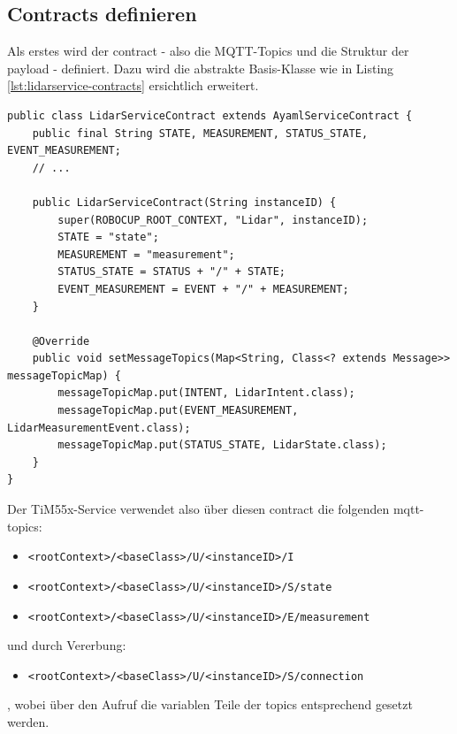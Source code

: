 \subsection{Contracts definieren}
Als erstes wird der \Gls{contract} - also die MQTT-Topics und die Struktur der \Gls{payload} - definiert. Dazu wird die abstrakte Basis-Klasse  wie in Listing \ref{lst:lidarservice-contracts} ersichtlich erweitert.
\begin{lstlisting}[caption={TiM55x-Service - Contracts},label={lst:lidarservice-contracts}]
public class LidarServiceContract extends AyamlServiceContract {
    public final String STATE, MEASUREMENT, STATUS_STATE, EVENT_MEASUREMENT;
    // ...

    public LidarServiceContract(String instanceID) {
        super(ROBOCUP_ROOT_CONTEXT, "Lidar", instanceID);
        STATE = "state";
        MEASUREMENT = "measurement";
        STATUS_STATE = STATUS + "/" + STATE;
        EVENT_MEASUREMENT = EVENT + "/" + MEASUREMENT;
    }

    @Override
    public void setMessageTopics(Map<String, Class<? extends Message>> messageTopicMap) {
        messageTopicMap.put(INTENT, LidarIntent.class);
        messageTopicMap.put(EVENT_MEASUREMENT, LidarMeasurementEvent.class);
        messageTopicMap.put(STATUS_STATE, LidarState.class);
    }
}
\end{lstlisting}
Der TiM55x-Service verwendet also über diesen \Gls{contract} die folgenden \acrshort{mqtt}-\Glspl{topic}:
\begin{itemize}
	\item \texttt{<rootContext>/<baseClass>/U/<instanceID>/I}
	\item \texttt{<rootContext>/<baseClass>/U/<instanceID>/S/state}
	\item \texttt{<rootContext>/<baseClass>/U/<instanceID>/E/measurement}
\end{itemize}
und durch Vererbung:
\begin{itemize}
	\item \texttt{<rootContext>/<baseClass>/U/<instanceID>/S/connection}
\end{itemize}
, wobei über den Aufruf  die variablen Teile der \Glspl{topic} entsprechend gesetzt werden.

